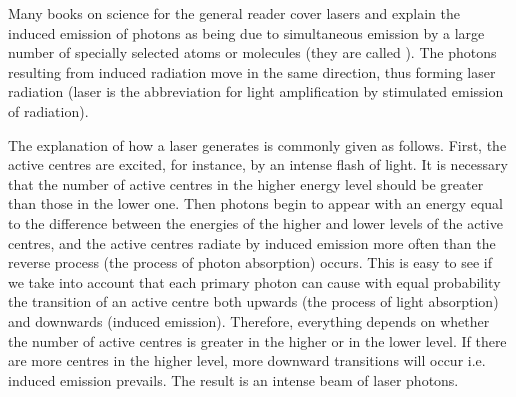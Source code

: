  Many books on science for the general reader cover lasers and explain the induced emission of photons
as being due to simultaneous emission by a large number of specially
selected atoms or molecules (they are called ). The photons resulting from induced radiation move in the same direction, thus
forming laser radiation (laser is the abbreviation for light amplification
by stimulated emission of radiation).

The explanation of how a laser generates is commonly given as
follows. First, the active centres are excited, for instance, by an intense
flash of light. It is necessary that the number of active centres in the higher
energy level should be greater than those in the lower one. Then
photons begin to appear with an energy equal to the difference between
the energies of the higher and lower levels of the active centres, and the
active centres radiate by induced emission more often than the reverse
process (the process of photon absorption) occurs. This is easy to see if
we take into account that each primary photon can cause with equal
probability the transition of an active centre both upwards (the process
of light absorption) and downwards (induced emission). Therefore,
everything depends on whether the number of active centres is greater
in the higher or in the lower level. If there are more centres in the higher
level, more downward transitions will occur i.e. induced emission
prevails. The result is an intense beam of laser photons.

